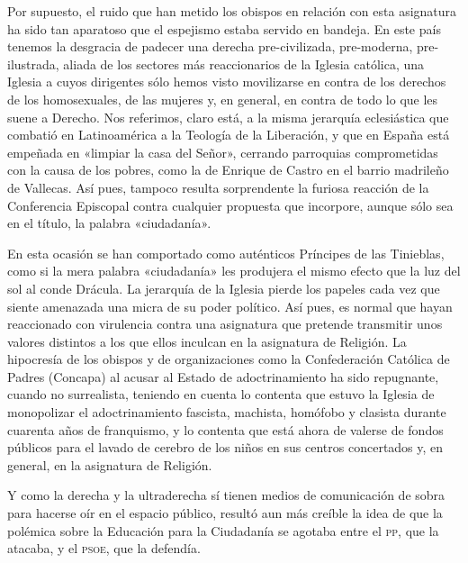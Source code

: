 \documentclass[draft,9pt,letterpaper,twocolumn,openany]{extbook}
\begin{document}
Por supuesto, el ruido que han metido los obispos en relación con esta asignatura ha sido tan aparatoso que el espejismo estaba servido en bandeja. En este
país tenemos la desgracia de padecer una derecha pre-civilizada, pre-moderna,
pre-ilustrada, aliada de los sectores más reaccionarios de la Iglesia católica, una
Iglesia a cuyos dirigentes sólo hemos visto movilizarse en contra de los derechos
de los homosexuales, de las mujeres y, en general, en contra de todo lo que les
suene a Derecho. Nos referimos, claro está, a la misma jerarquía eclesiástica que
combatió en Latinoamérica a la Teología de la Liberación, y que en España está
empeñada en «limpiar la casa del Señor», cerrando parroquias comprometidas con
la causa de los pobres, como la de Enrique de Castro en el barrio madrileño de Vallecas. Así pues, tampoco resulta sorprendente la furiosa reacción de la Conferencia Episcopal contra cualquier propuesta que incorpore, aunque sólo sea en el título, la palabra «ciudadanía». 

En esta ocasión se han comportado como auténticos
Príncipes de las Tinieblas, como si la mera palabra «ciudadanía» les produjera el
mismo efecto que la luz del sol al conde Drácula. La jerarquía de la Iglesia pierde
los papeles cada vez que siente amenazada una micra de su poder político. Así
pues, es normal que hayan reaccionado con virulencia contra una asignatura que
pretende transmitir unos valores distintos a los que ellos inculcan en la asignatura de Religión. La hipocresía de los obispos y de organizaciones como la Confederación Católica de Padres (Concapa) al acusar al Estado de adoctrinamiento ha
sido repugnante, cuando no surrealista, teniendo en cuenta lo contenta que estuvo la Iglesia de monopolizar el adoctrinamiento fascista, machista, homófobo y clasista durante cuarenta años de franquismo, y lo contenta que está ahora de valerse de fondos públicos para el lavado de cerebro de los niños en sus centros
concertados y, en general, en la asignatura de Religión.

Y como la derecha y la ultraderecha sí tienen medios de comunicación de sobra para hacerse oír en el espacio público, resultó aun más creíble la idea de que
la polémica sobre la Educación para la Ciudadanía se agotaba entre el \textsc{pp}, que la
atacaba, y el \textsc{psoe}, que la defendía.
\end{document}
